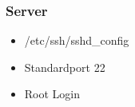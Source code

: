 \begin{frame}
\frametitle{Server}
\begin{itemize}
\item /etc/ssh/sshd\_config
\item Standardport 22
\item Root Login
\end{itemize}
\end{frame}